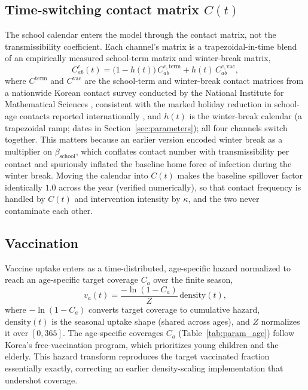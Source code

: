 \documentclass[12pt]{article}
\theoremstyle{plain}
\theoremstyle{remark}
\theoremstyle{definition}
\begin{document}
\subsection{Time-switching contact matrix \texorpdfstring{$C(t)$}{C(t)}}
\label{sec:ctime}
The school calendar enters the model through the contact matrix, not the transmissibility coefficient. Each channel's matrix is a trapezoidal-in-time blend of an empirically measured school-term matrix and winter-break matrix,
\begin{equation}
C^{c}_{ab}(t) = \bigl(1 - h(t)\bigr)\, C^{c,\mathrm{term}}_{ab} + h(t)\, C^{c,\mathrm{vac}}_{ab},
\end{equation}
where $C^{\mathrm{term}}$ and $C^{\mathrm{vac}}$ are the school-term and winter-break contact matrices from a nationwide Korean contact survey conducted by the National Institute for Mathematical Sciences \cite{Son2025,Chae2026}, consistent with the marked holiday reduction in school-age contacts reported internationally \cite{Eames2012}, and $h(t)$ is the winter-break calendar (a trapezoidal ramp; dates in Section~\ref{sec:parameters}); all four channels switch together. This matters because an earlier version encoded winter break as a multiplier on $\beta_{\mathrm{school}}$, which conflates contact number with transmissibility per contact and spuriously inflated the baseline home force of infection during the winter break. Moving the calendar into $C(t)$ makes the baseline spillover factor identically $1.0$ across the year (verified numerically), so that contact frequency is handled by $C(t)$ and intervention intensity by $\kappa$, and the two never contaminate each other.

\subsection{Vaccination}
\label{sec:vax}
Vaccine uptake enters as a time-distributed, age-specific hazard normalized to reach an age-specific target coverage $C_a$ over the finite season,
\begin{equation}
v_a(t) = \frac{-\ln(1 - C_a)}{Z}\, \mathrm{density}(t),
\end{equation}
where $-\ln(1 - C_a)$ converts target coverage to cumulative hazard, $\mathrm{density}(t)$ is the seasonal uptake shape (shared across ages), and $Z$ normalizes it over $[0,365]$. The age-specific coverages $C_a$ (Table~\ref{tab:param_age}) follow Korea's free-vaccination program, which prioritizes young children and the elderly. This hazard transform reproduces the target vaccinated fraction essentially exactly, correcting an earlier density-scaling implementation that undershot coverage.
\end{document}
